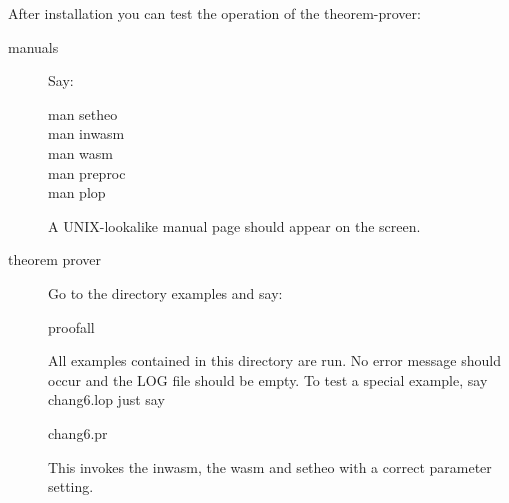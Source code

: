 %
%
%
%


After installation you can test the operation of the theorem-prover:
\begin{description}
\item[manuals]  Say: \vspace{-2mm}

\begin{center}
                man setheo \\
                man inwasm \\
                man wasm \\
                man preproc \\
                man plop \\
\end{center} \vspace{-2mm}

  A UNIX-lookalike manual page should appear on the screen.

\item[theorem prover] Go to the directory  examples
  and say: \vspace{-2mm}
           
\begin{center}
                proofall
\end{center} \vspace{-2mm}

  All examples contained in this directory are run. No error message
  should occur and the LOG file should be empty.
  To test a special example, say chang6.lop just say
 \vspace{-2mm}
\begin{center}
                chang6.pr
\end{center}
 \vspace{-2mm}
  This invokes the inwasm, the wasm and setheo with a correct
  parameter setting.
\end{description}

